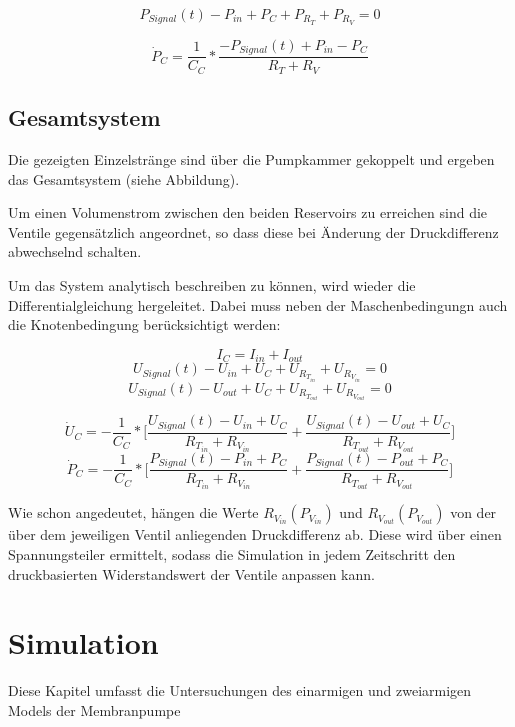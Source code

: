 \documentclass[fontsize=12pt, a4paper]{scrartcl}
\let\stdsection\section 	%
\renewcommand\section{\newpage\stdsection}
\begin{document}
\[ P_{Signal}(t) - P_{in} + P_{C} + P_{R_{T}} + P_{R_{V}} = 0 \]

\[ \dot{P}_{C} = \frac{1}{C_{C}} * \frac{-P_{Signal}(t)+P_{in}-P_{C}}{R_{T}+R_{V}} \]



\subsection{Gesamtsystem}

Die gezeigten Einzelstränge sind über die Pumpkammer gekoppelt und ergeben das Gesamtsystem (siehe Abbildung).


\begin{center}
	
\end{center}

Um einen Volumenstrom zwischen den beiden Reservoirs zu erreichen sind die Ventile gegensätzlich angeordnet, so dass diese bei Änderung der Druckdifferenz abwechselnd schalten. 

Um das System analytisch beschreiben zu können, wird wieder die Differentialgleichung hergeleitet. Dabei muss neben der Maschenbedingungn auch die Knotenbedingung berücksichtigt werden:

\[ I_{C} = I_{in} + I_{out} \]
\[ U_{Signal}(t) - U_{in} + U_{C} + U_{R_{T_{in}}} + U_{R_{V_{in}}} = 0 \]
\[ U_{Signal}(t) - U_{out} + U_{C} + U_{R_{T_{out}}} + U_{R_{V_{out}}} = 0 \]

\[ \dot{U}_{C} = - \frac{1}{C_{C}} * \biggl[\frac{U_{Signal}(t)-U_{in}+U_{C}}{R_{T_{in}}+R_{V_{in}}} + \frac{U_{Signal}(t)-U_{out}+U_{C}}{R_{T_{out}}+R_{V_{out}}}\biggr] \]
\[ \dot{P}_{C} = - \frac{1}{C_{C}} * \biggl[\frac{P_{Signal}(t)-P_{in}+P_{C}}{R_{T_{in}}+R_{V_{in}}} + \frac{P_{Signal}(t)-P_{out}+P_{C}}{R_{T_{out}}+R_{V_{out}}}\biggr] \]

Wie schon angedeutet, hängen die Werte $R_V_{in}(P_V_{in})$ und $R_V_{out}(P_V_{out})$ von der über dem jeweiligen Ventil anliegenden Druckdifferenz ab. Diese wird über einen Spannungsteiler ermittelt, sodass die Simulation in jedem Zeitschritt den druckbasierten Widerstandswert der Ventile anpassen kann.

\section{Simulation}

Diese Kapitel umfasst die Untersuchungen des einarmigen und zweiarmigen Models der Membranpumpe
\end{document}
